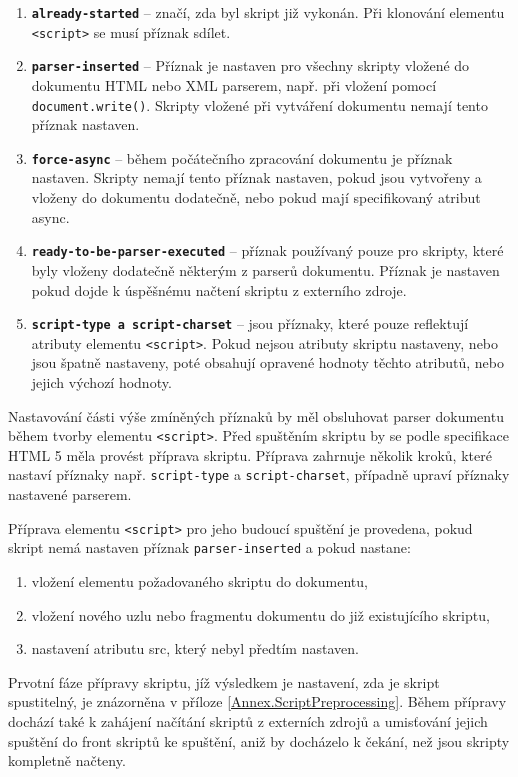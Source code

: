 \begin{enumerate}
  \item \textbf{\texttt{already-started}} -- značí, zda byl skript již vykonán. Při klonování elementu \texttt{<script>} se musí příznak sdílet.
  \item \textbf{\texttt{parser-inserted}} -- Příznak je nastaven pro všechny skripty vložené do dokumentu HTML nebo XML parserem, např. při vložení pomocí \texttt{document.write()}. Skripty vložené při vytváření dokumentu nemají tento příznak nastaven.
  \item \textbf{\texttt{force-async}} -- během počátečního zpracování dokumentu je příznak nastaven. Skripty nemají tento příznak nastaven, pokud jsou vytvořeny a vloženy do dokumentu dodatečně, nebo pokud mají specifikovaný atribut async.
  \item \textbf{\texttt{ready-to-be-parser-executed}} -- příznak používaný pouze pro skripty, které byly vloženy dodatečně některým z parserů dokumentu. Příznak je nastaven pokud dojde k úspěšnému načtení skriptu z externího zdroje.
  \item \textbf{\texttt{script-type a script-charset}} -- jsou příznaky, které pouze reflektují atributy elementu \texttt{<script>}. Pokud nejsou atributy skriptu nastaveny, nebo jsou špatně nastaveny, poté obsahují opravené hodnoty těchto atributů, nebo jejich výchozí hodnoty.
\end{enumerate}

Nastavování části výše zmíněných příznaků by měl obsluhovat parser dokumentu během tvorby elementu \texttt{<script>}. Před spuštěním skriptu by se podle specifikace HTML 5 měla provést příprava skriptu. Příprava zahrnuje několik kroků, které nastaví příznaky např. \texttt{script-type} a \texttt{script-charset}, případně upraví příznaky nastavené parserem. 

Příprava elementu \texttt{<script>} pro jeho budoucí spuštění je provedena, pokud skript nemá nastaven příznak \texttt{parser-inserted} a pokud nastane:

\begin{enumerate}
  \item vložení elementu požadovaného skriptu do dokumentu,
  \item vložení nového uzlu nebo fragmentu dokumentu do již existujícího skriptu,
  \item nastavení atributu src, který nebyl předtím nastaven.
\end{enumerate}

Prvotní fáze přípravy skriptu, jíž výsledkem je nastavení, zda je skript spustitelný, je znázorněna v příloze \ref{Annex.ScriptPreprocessing}. Během přípravy dochází také k zahájení načítání skriptů z externích zdrojů a umisťování jejich spuštění do front skriptů ke spuštění, aniž by docházelo k čekání, než jsou skripty kompletně načteny. 

